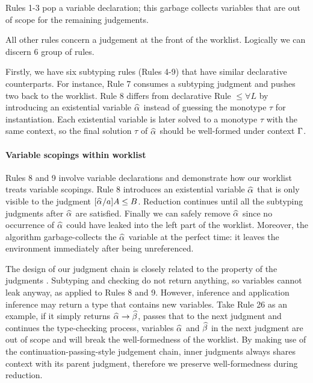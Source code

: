Rules 1-3 pop a variable declaration; this garbage collects variables that are
out of scope for the remaining judgements.

All other rules concern a judgement at the front of the worklist. Logically we can discern 6 group of rules.

Firstly, we have six subtyping rules (Rules 4-9) that have similar 
declarative counterparts.  For instance, Rule 7 consumes a subtyping
judgment and pushes two back to the worklist.  Rule 8 differs from
declarative Rule ${\le}{\forall}L$ by introducing an existential
variable $\al$ instead of guessing the monotype $\tau$ for
instantiation.  Each existential variable is later solved to a
monotype $\tau$ with the same context, so the final solution $\tau$ of
$\al$ should be well-formed under context $\Gamma$.

\paragraph{Variable scopings within worklist}
Rules 8 and 9 involve variable declarations and demonstrate how our
worklist treats variable scopings. Rule 8 introduces an existential
variable $\al$ that is only visible to the judgment $[\al/a]A \le B$.
Reduction continues until all the subtyping judgments after $\al$
are satisfied.  Finally we can safely remove $\al$ since no occurrence
of $\al$ could have leaked into the left part of the worklist.  Moreover,
the algorithm garbage-collects the $\al$
variable at the perfect time: it leaves the environment immediately
after being unreferenced.

The design of our judgment chain is closely related to the property of
the judgments
.
Subtyping and checking do not return anything, so variables cannot
leak anyway, as applied to Rules 8 and 9.
However, inference and application inference may return a type that contains new variables.
Take Rule 26 as an example, if it simply returns $\al \to \bt$,
passes that to the next judgment and continues the type-checking process,
variables $\al$ and $\bt$ in the next judgment are out of scope
and will break the well-formedness of the worklist.
By making use of the continuation-passing-style judgement chain,
inner judgments always shares context with its parent judgment,
therefore we preserve well-formedness during reduction.

